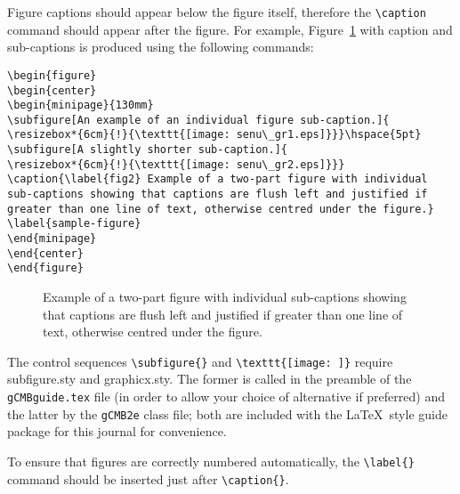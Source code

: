 \documentclass{gCMB2e}
\begin{document}
Figure captions should appear below the figure itself, therefore the \verb"\caption" command should appear after the
figure. For example, Figure~\ref{sample-figure} with caption and sub-captions is produced using the following
commands:
%
\begin{verbatim}
\begin{figure}
\begin{center}
\begin{minipage}{130mm}
\subfigure[An example of an individual figure sub-caption.]{
\resizebox*{6cm}{!}{\texttt{[image: senu\_gr1.eps]}}}\hspace{5pt}
\subfigure[A slightly shorter sub-caption.]{
\resizebox*{6cm}{!}{\texttt{[image: senu\_gr2.eps]}}}
\caption{\label{fig2} Example of a two-part figure with individual
sub-captions showing that captions are flush left and justified if
greater than one line of text, otherwise centred under the figure.}
\label{sample-figure}
\end{minipage}
\end{center}
\end{figure}
\end{verbatim}

\begin{figure}
\begin{center}
\begin{minipage}{130mm}
\hspace{5pt}
\caption{\label{fig2} Example of a two-part figure with individual
 sub-captions showing that captions are flush left and justified if
 greater than one line of text, otherwise centred under the figure.}
\label{sample-figure}
\end{minipage}
\end{center}
\end{figure}

The control sequences \verb"\subfigure{}" and \verb"\texttt{[image: ]}" require subfigure.sty and graphicx.sty.
The former is called in the preamble of the \texttt{gCMBguide.tex} file (in order to allow your choice of alternative if preferred)
and the latter by the \texttt{gCMB2e} class file; both are included with the \LaTeX\ style guide package for this journal for convenience.

To ensure that figures are correctly numbered automatically, the \verb"\label{}" command should be inserted just
after \verb"\caption{}".
\end{document}
